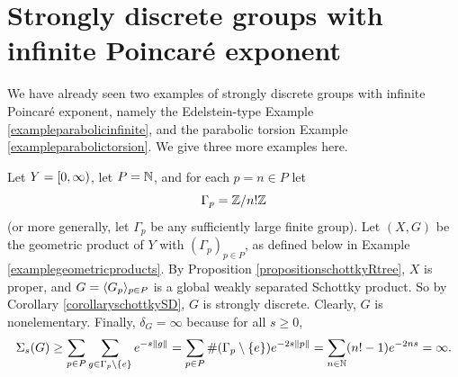 \section{Strongly discrete groups with infinite Poincar\'e exponent}
We have already seen two examples of strongly discrete groups with infinite Poincar\'e exponent, namely the Edelstein-type Example \ref{exampleparabolicinfinite}, and the parabolic torsion Example \ref{exampleparabolictorsion}. We give three more examples here.


\begin{example}[A nonelementary strongly discrete group $G$ acting on a proper $\R$-tree $X$ and satisfying $\delta_G = \infty$]
\label{exampleinfinitepoincare}
Let $Y = {[0,\infty)}$, let $P = \N$, and for each $p = n\in P$ let
\[
\Gamma_p = \Z/n!\Z
\]
(or more generally, let $\Gamma_p$ be any sufficiently large finite group). Let $(X,G)$ be the geometric product of $Y$ with $(\Gamma_p)_{p\in P}$, as defined below in Example \ref{examplegeometricproducts}. By Proposition \ref{propositionschottkyRtree}, $X$ is proper, and $G = \langle G_p\rangle_{p\in P}$ is a global weakly separated Schottky product. So by Corollary \ref{corollaryschottkySD}, $G$ is strongly discrete. Clearly, $G$ is nonelementary. Finally, $\delta_G = \infty$ because for all $s\geq 0$,
\[
\Sigma_s(G) \geq \sum_{p\in P} \sum_{g\in \Gamma_p\butnot\{e\}} e^{-s\dogo g} = \sum_{p\in P} \#(\Gamma_p\butnot\{e\}) e^{-2s\dox p} = \sum_{n\in\N} (n! - 1) e^{-2ns} = \infty.
\]
\end{example}

